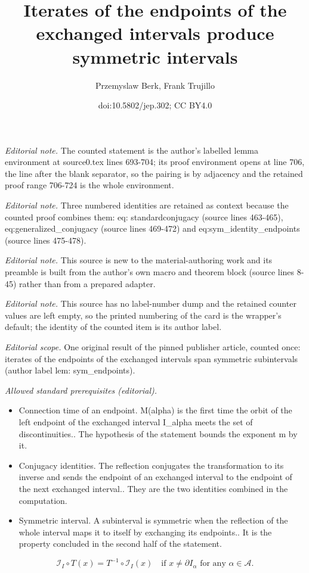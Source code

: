 \documentclass[10pt,a4paper]{article}
\title{Iterates of the endpoints of the exchanged intervals produce symmetric intervals}
\author{Przemyslaw Berk, Frank Trujillo}
\date{doi:10.5802/jep.302; CC BY4.0}
\theoremstyle{plain}
\theoremstyle{definition}
\newcommand{\A}{\mathcal{A}}
\begin{document}
\maketitle
\noindent\textit{Editorial note.} The counted statement is the author's labelled lemma environment at source0.tex lines 693-704; its proof environment opens at line 706, the line after the blank separator, so the pairing is by adjacency and the retained proof range 706-724 is the whole environment.\par\medskip
\noindent\textit{Editorial note.} Three numbered identities are retained as context because the counted proof combines them: eq: standardconjugacy (source lines 463-465), eq:generalized\_conjugacy (source lines 469-472) and eq:sym\_identity\_endpoints (source lines 475-478).\par\medskip
\noindent\textit{Editorial note.} This source is new to the material-authoring work and its preamble is built from the author's own macro and theorem block (source lines 8-45) rather than from a prepared adapter.\par\medskip
\noindent\textit{Editorial note.} This source has no label-number dump and the retained counter values are left empty, so the printed numbering of the card is the wrapper's default; the identity of the counted item is its author label.\par\medskip
\noindent\textit{Editorial scope.} One original result of the pinned publisher article, counted once: iterates of the endpoints of the exchanged intervals span symmetric subintervals (author label lem: sym\_endpoints).\par\medskip
\noindent\textit{Allowed standard prerequisites (editorial).}\begin{itemize}
\item Connection time of an endpoint. M(alpha) is the first time the orbit of the left endpoint of the exchanged interval I\_alpha meets the set of discontinuities.. The hypothesis of the statement bounds the exponent m by it.
\item Conjugacy identities. The reflection conjugates the transformation to its inverse and sends the endpoint of an exchanged interval to the endpoint of the next exchanged interval.. They are the two identities combined in the computation.
\item Symmetric interval. A subinterval is symmetric when the reflection of the whole interval maps it to itself by exchanging its endpoints.. It is the property concluded in the second half of the statement.
\end{itemize}\medskip
\begin{equation}\label{eq: standardconjugacy}
\mathcal{I}_I\circ T(x)=T^{-1}\circ\mathcal{I}_I(x) \quad \text{if } x \neq \partial I_{\alpha} \text{ for any } \alpha \in \A.
\end{equation}
\end{document}
